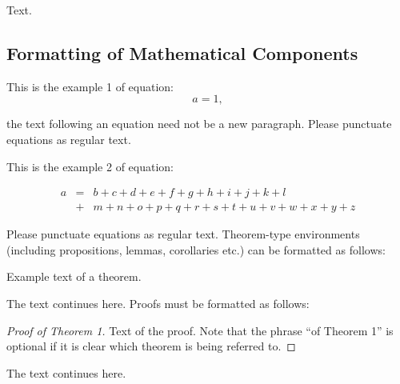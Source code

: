 \begin{paracol}{2}
Text.

\subsection{Formatting of Mathematical Components}

This is the example 1 of equation:
\begin{equation}
a = 1,
\end{equation}

the text following an equation need not be a new paragraph. Please punctuate equations as regular text.

This is the example 2 of equation:
\end{paracol}
\nointerlineskip
\begin{eqnarray}
a &=& b + c + d + e + f + g + h + i + j + k + l\nonumber \\
 &+& m + n + o + p + q + r + s + t + u + v + w + x + y + z %
\end{eqnarray}






\begin{paracol}{2}
\linenumbers
\switchcolumn
Please punctuate equations as regular text. Theorem-type environments (including propositions, lemmas, corollaries etc.) can be formatted as follows:
\begin{Theorem}
Example text of a theorem.
\end{Theorem}

The text continues here. Proofs must be formatted as follows:

\begin{proof}[Proof of Theorem 1]
Text of the proof. Note that the phrase ``of Theorem 1'' is optional if it is clear which theorem is being referred to.
\end{proof}
The text continues here.

\end{paracol}
